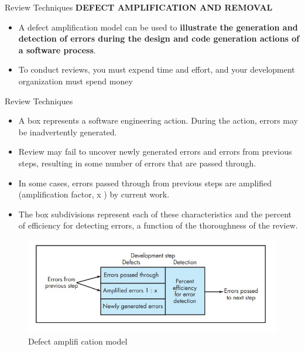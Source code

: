 \documentclass{beamer}
\begin{document}
\begin{frame}{Review Techniques}
	\textbf{DEFECT AMPLIFICATION AND REMOVAL}
	\begin{itemize}
		\item A defect amplification model can be used to \textbf{illustrate the generation and detection of errors during the design and code generation actions of a software process}. 
		\item To conduct reviews, you must expend time and effort, and your development 
		organization must spend money
		
	\end{itemize}

\end{frame}
\begin{frame}{Review Techniques}
	\begin{itemize}
		\item A box represents a software engineering action. 
		During the action, errors may be inadvertently generated. 
		\item Review may fail to uncover newly generated errors and errors from previous steps, resulting in some number of errors that are passed through. 
		\item In some cases, errors passed through from previous steps are amplified (amplification factor, x ) by current work. 
		\item The box subdivisions represent each of these characteristics and the percent of efficiency for detecting errors, a function of the thoroughness of the review.
		
	\end{itemize}
	\begin{figure}
		\includegraphics[scale=.45]{img/m3_16}
		\caption{Defect 
			amplifi cation 
			model}
	\end{figure}
\end{frame}
\end{document}
